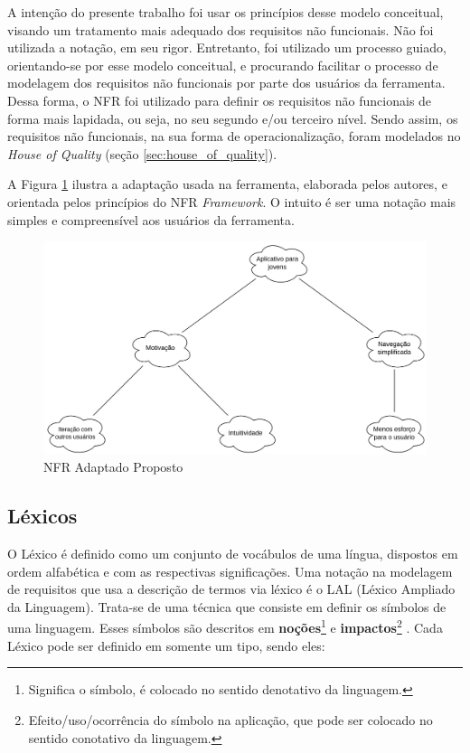 A intenção do presente trabalho foi usar os princípios desse modelo conceitual, visando um tratamento mais adequado dos requisitos não funcionais. Não foi utilizada a notação, em seu rigor. Entretanto, foi utilizado um processo guiado, orientando-se por esse modelo conceitual, e procurando facilitar o processo de modelagem dos requisitos não funcionais por parte dos usuários da ferramenta. Dessa forma, o NFR foi utilizado para definir os requisitos não funcionais de forma mais lapidada, ou seja, no seu segundo e/ou terceiro nível. Sendo assim, os requisitos não funcionais, na sua forma de operacionalização, foram modelados no \textit{House of Quality} (seção \ref{sec:house_of_quality}).

A Figura \ref{fig:nfr_example} ilustra a adaptação usada na ferramenta, elaborada pelos autores, e orientada pelos princípios do NFR \textit{Framework}. O intuito é ser uma notação mais simples e compreensível aos usuários da ferramenta.

\begin{figure}[H]
    \begin{center}
        \caption{NFR Adaptado Proposto}
        \label{fig:nfr_example}
        \includegraphics[scale=0.60]{figuras/Embasamento/nfr_adaptado.png}
    \end{center}
\end{figure}


\subsection{Léxicos}

\label{sec:lexicos}

O Léxico é definido como um conjunto de vocábulos de uma língua, dispostos em ordem alfabética e com as respectivas significações. Uma notação na modelagem de requisitos que usa a descrição de termos via léxico é o LAL (Léxico Ampliado da Linguagem). Trata-se de uma técnica que consiste em definir os símbolos de uma linguagem. Esses símbolos são descritos em \textbf{noções}\footnote{Significa o símbolo, é colocado no sentido denotativo da linguagem.} e \textbf{impactos}\footnote{Efeito/uso/ocorrência do símbolo na aplicação, que pode ser colocado no sentido conotativo da linguagem.} \cite{leite1993strategy}. Cada Léxico pode ser definido em somente um tipo, sendo eles:

